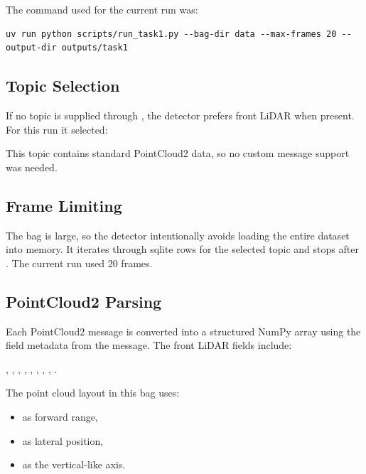 \documentclass[11pt,a4paper]{article}
\begin{document}
The command used for the current run was:

\begin{verbatim}
uv run python scripts/run_task1.py --bag-dir data --max-frames 20 --output-dir outputs/task1
\end{verbatim}

\subsection{Topic Selection}

If no topic is supplied through , the detector prefers front LiDAR
when present. For this run it selected:

\begin{center}
\end{center}

This topic contains standard PointCloud2 data, so no custom message support was
needed.

\subsection{Frame Limiting}

The bag is large, so the detector intentionally avoids loading the entire
dataset into memory. It iterates through sqlite rows for the selected topic and
stops after . The current run used 20 frames.

\subsection{PointCloud2 Parsing}

Each PointCloud2 message is converted into a structured NumPy array using the
field metadata from the message. The front LiDAR fields include:

\begin{center}
, , , , ,
, , , .
\end{center}

The point cloud layout in this bag uses:

\begin{itemize}
  \item {} as forward range,
  \item {} as lateral position,
  \item {} as the vertical-like axis.
\end{itemize}
\end{document}
